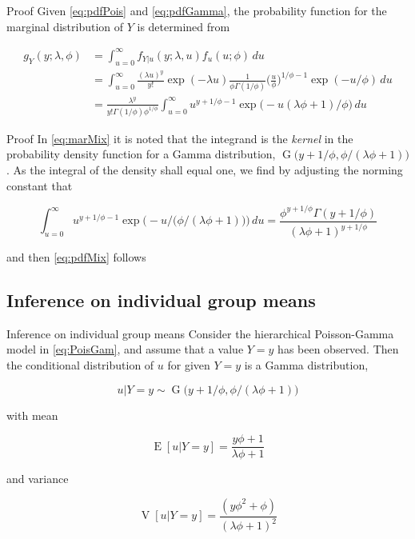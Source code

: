 \documentclass[aspectratio=169]{beamer}
\DeclareMathOperator{\E}{E}
\DeclareMathOperator{\V}{V}
\DeclareMathOperator{\G}{G}
\begin{document}
\begin{frame}{Proof}
\protect\hypertarget{proof-1}{}
Given \eqref{eq:pdfPois} and \eqref{eq:pdfGamma}, the probability
function for the marginal distribution of \(Y\) is determined from

\begin{equation} \label{eq:marMix}
  \begin{aligned}
    g_{Y}(y;\lambda,\phi)&=\int_{u=0}^\infty f_{Y|u}(y;\lambda, u) f_{u}(u;\phi) \,du \\
    &=\int_{u=0}^\infty \frac{(\lambda u)^y}{y!} \exp (-\lambda u) \frac{1}{\phi \Gamma(1/\phi)} \bigg(\frac{u}{\phi}\bigg)^{1/\phi-1} \exp (-u/\phi) \,du\\
    &=\frac{\lambda^{y}}{y!\Gamma(1/\phi)\phi^{1/\phi}} \int_{u=0}^\infty u^{y+1/\phi-1} \exp \big(-u(\lambda \phi+1)/\phi\big) \,du
  \end{aligned}
\end{equation}
\end{frame}

\begin{frame}{Proof}
\protect\hypertarget{proof-2}{}
In \eqref{eq:marMix} it is noted that the integrand is the \emph{kernel}
in the probability density function for a Gamma distribution,
\(\G\big(y+1/\phi,\phi/(\lambda \phi+1)\big)\). As the integral of the
density shall equal one, we find by adjusting the norming constant that

\begin{equation}
  \int_{u=0}^\infty u^{y+1/\phi-1} \exp \bigg(-u/\Big(\phi/(\lambda \phi+1)\Big)\bigg) \,du = \frac{\phi^{y+1/\phi}\Gamma(y+1/\phi)}{(\lambda \phi + 1)^{y+1/\phi}}
\end{equation}

and then \eqref{eq:pdfMix} follows
\end{frame}

\hypertarget{inference-on-individual-group-means}{%
\subsection{Inference on individual group
means}\label{inference-on-individual-group-means}}

\begin{frame}{Inference on individual group means}
Consider the hierarchical Poisson-Gamma model in \eqref{eq:PoisGam}, and
assume that a value \(Y=y\) has been observed. Then the conditional
distribution of \(u\) for given \(Y=y\) is a Gamma distribution,

\begin{equation}
  u|Y=y\sim \G\big(y+1/\phi,\phi/(\lambda \phi+1)\big)
\end{equation}

with mean

\begin{equation}
  \E[u|Y=y]=\frac{y\phi+1}{\lambda\phi+1}
\end{equation}

and variance

\begin{equation}
  \V[u|Y=y]=\frac{(y \phi^2+\phi)}{(\lambda \phi + 1)^2}
\end{equation}
\end{frame}
\end{document}

